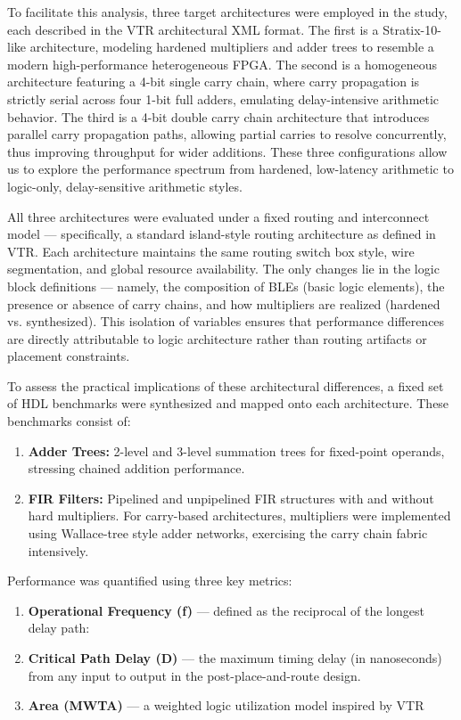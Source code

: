 To facilitate this analysis, three target architectures were employed in the study, each described in the VTR architectural XML format. The first is a Stratix-10-like architecture, modeling hardened multipliers and adder trees to resemble a modern high-performance heterogeneous FPGA. The second is a homogeneous architecture featuring a 4-bit single carry chain, where carry propagation is strictly serial across four 1-bit full adders, emulating delay-intensive arithmetic behavior. The third is a 4-bit double carry chain architecture that introduces parallel carry propagation paths, allowing partial carries to resolve concurrently, thus improving throughput for wider additions. These three configurations allow us to explore the performance spectrum from hardened, low-latency arithmetic to logic-only, delay-sensitive arithmetic styles.

All three architectures were evaluated under a fixed routing and interconnect model — specifically, a standard island-style routing architecture as defined in VTR. Each architecture maintains the same routing switch box style, wire segmentation, and global resource availability. The only changes lie in the logic block definitions — namely, the composition of BLEs (basic logic elements), the presence or absence of carry chains, and how multipliers are realized (hardened vs. synthesized). This isolation of variables ensures that performance differences are directly attributable to logic architecture rather than routing artifacts or placement constraints.

To assess the practical implications of these architectural differences, a fixed set of HDL benchmarks were synthesized and mapped onto each architecture. These benchmarks consist of:
\begin{enumerate}
	\item \textbf{Adder Trees:} 2-level and 3-level summation trees for fixed-point operands, stressing chained addition performance.
	\item \textbf{FIR Filters:} Pipelined and unpipelined FIR structures with and without hard multipliers. For carry-based architectures, multipliers were implemented using Wallace-tree style adder networks, exercising the carry chain fabric intensively.
\end{enumerate}

Performance was quantified using three key metrics:
\begin{enumerate}
	\item \textbf{Operational Frequency (f)} — defined as the reciprocal of the longest delay path:
	\item \textbf{Critical Path Delay (D)} — the maximum timing delay (in nanoseconds) from any input to output in the post-place-and-route design.
	\item \textbf{Area (MWTA)}  — a weighted logic utilization model inspired by VTR
\end{enumerate}

